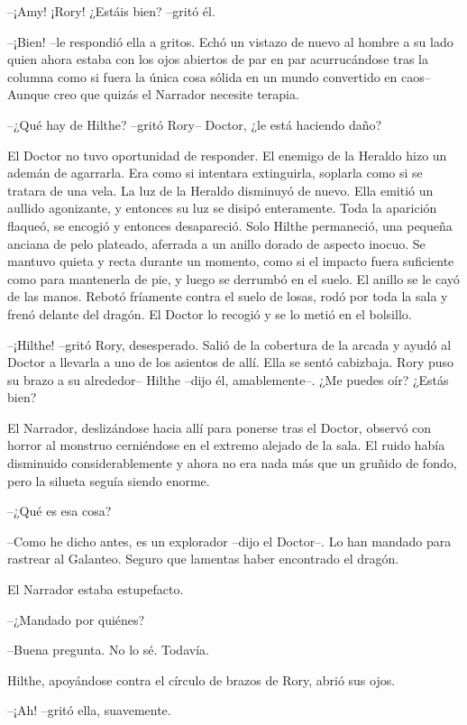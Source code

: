 {--¡Amy! ¡Rory! ¿Estáis bien? --gritó él.}

{--¡Bien! --le respondió ella a gritos. Echó un vistazo de nuevo al
	hombre a su lado quien ahora estaba con los ojos abiertos de par en par
	acurrucándose tras la columna como si fuera la única cosa sólida en un
	mundo convertido en caos-- Aunque creo que quizás el Narrador necesite
terapia.}

{--¿Qué hay de Hilthe? --gritó Rory-- Doctor, ¿le está haciendo daño?}

{El Doctor no tuvo oportunidad de responder. El enemigo de la Heraldo
	hizo un ademán de agarrarla. Era como si intentara extinguirla, soplarla
	como si se tratara de una vela. La luz de la Heraldo disminuyó de nuevo.
	Ella emitió un aullido agonizante, y entonces su luz se disipó
	enteramente. Toda la aparición flaqueó, se encogió y entonces
	desapareció. Solo Hilthe permaneció, una pequeña anciana de pelo
	plateado, aferrada a un anillo dorado de aspecto inocuo. Se mantuvo
	quieta y recta durante un momento, como si el impacto fuera suficiente
	como para mantenerla de pie, y luego se derrumbó en el suelo. El anillo
	se le cayó de las manos. Rebotó fríamente contra el suelo de losas, rodó
	por toda la sala y frenó delante del dragón. El Doctor lo recogió y se
lo metió en el bolsillo.}

{--¡Hilthe! --gritó Rory, desesperado. Salió de la cobertura de la
	arcada y ayudó al Doctor a llevarla a uno de los asientos de allí. Ella
	se sentó cabizbaja. Rory puso su brazo a su alrededor-- Hilthe --dijo
él, amablemente--. ¿Me puedes oír? ¿Estás bien?}

{El Narrador, deslizándose hacia allí para ponerse tras el Doctor,
	observó con horror al monstruo cerniéndose en el extremo alejado de la
	sala. El ruido había disminuido considerablemente y ahora no era nada
más que un gruñido de fondo, pero la silueta seguía siendo enorme.}

{--¿Qué es esa cosa?}

{--Como he dicho antes, es un explorador --dijo el Doctor--. Lo han
	mandado para rastrear al Galanteo. Seguro que lamentas haber encontrado
el dragón.}

{El Narrador estaba estupefacto.}

{--¿Mandado por quiénes?}

{--Buena pregunta. No lo sé. Todavía.}

{Hilthe, apoyándose contra el círculo de brazos de Rory, abrió sus
ojos.}

{--¡Ah! --gritó ella, suavemente.}

